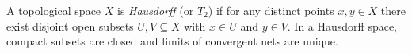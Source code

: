 
A topological space $X$ is \emph{Hausdorff} (or $T_2$) if for any distinct points $x,y\in X$ there exist disjoint open subsets $U,V\subseteq X$ with $x\in U$ and $y\in V$. In a Hausdorff space, compact subsets are closed and limits of convergent nets are unique.
